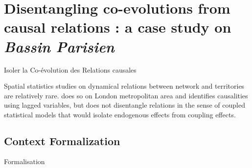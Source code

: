 














\newpage

\section[Disentangling co-evolutions from causal relations]{Disentangling co-evolutions from causal relations : a case study on \emph{Bassin Parisien}}{Isoler la Co-évolution des Relations causales}

Spatial statistics studies on dynamical relations between network and territories are relatively rare. \cite{levinson2008density} does so on London metropolitan area and identifies causalities using lagged variables, but does not disentangle relations in the sense of coupled statistical models that would isolate endogenous effects from coupling effects.




\subsection{Context Formalization}{Formalisation}




